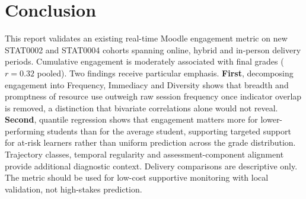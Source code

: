 \documentclass[11pt,a4paper]{article}
\begin{document}
\section{Conclusion}
This report validates an existing real-time Moodle engagement metric on new
STAT0002 and STAT0004 cohorts spanning online, hybrid and in-person delivery
periods. Cumulative engagement is moderately associated with final grades
($r=0.32$ pooled). Two findings receive particular emphasis. \textbf{First},
decomposing engagement into Frequency, Immediacy and Diversity shows that
breadth and promptness of resource use outweigh raw session frequency once
indicator overlap is removed, a distinction that bivariate correlations alone
would not reveal. \textbf{Second}, quantile regression shows that engagement
matters more for lower-performing students than for the average student,
supporting targeted support for at-risk learners rather than uniform prediction
across the grade distribution. Trajectory classes, temporal regularity and
assessment-component alignment provide additional diagnostic context. Delivery
comparisons are descriptive only. The metric should be used for low-cost
supportive monitoring with local validation, not high-stakes prediction.
\end{document}
